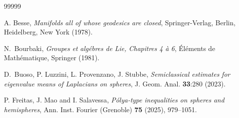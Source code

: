 \documentclass[11pt,a4paper,times]{amsart}
\theoremstyle{plain}
\theoremstyle{definition}
\numberwithin{equation}{section}
\begin{document}
{\begin{thebibliography}{99999}

 A. Besse, 
\emph{Manifolds all of whose geodesics are closed}, Springer-Verlag,  Berlin, Heidelberg, New York (1978).

 N.\ Bourbaki, \emph{Groupes et alg\'{e}bres de Lie, Chapitres 4 \`{a} 6}, \'{E}l\'{e}ments de Math\'{e}matique, Springer (1981).

 D.\ Buoso, P. Luzzini, L. Provenzano, J. Stubbe,
\emph{Semiclassical estimates for eigenvalue means of Laplacians on spheres},
{J. Geom. Anal.} {\bf 33}:280 (2023).
 









P. Freitas, J. Mao and I. Salavessa,
\emph{P\'{o}lya-type inequalities on spheres and hemispheres},
{Ann. Inst. Fourier (Grenoble)} {\bf 75} (2025), 979--1051.


\end{thebibliography}}
\end{document}
